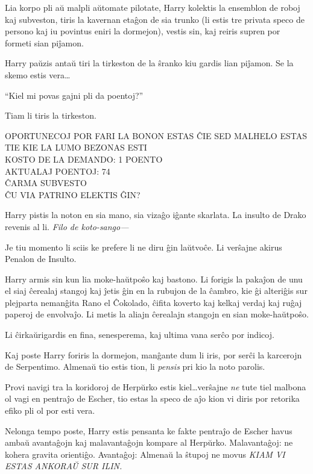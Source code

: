 Lia korpo pli aŭ malpli aŭtomate pilotate, Harry kolektis la ensemblon
de roboj kaj subveston, tiris la kavernan etaĝon de sia trunko (li estis
tre privata speco de persono kaj iu povintus eniri la dormejon), vestis
sin, kaj reiris supren por formeti sian piĵamon.

Harry paŭzis antaŭ tiri la tirkeston de la ŝranko kiu gardis lian
piĵamon. Se la skemo estis vera\ldots

``Kiel mi povas gajni pli da poentoj?''

Tiam li tiris la tirkeston.

\begin{center}
OPORTUNECOJ POR FARI LA BONON ESTAS ĈIE SED MALHELO ESTAS TIE KIE LA
LUMO BEZONAS ESTI \\
KOSTO DE LA DEMANDO: 1 POENTO\\
AKTUALAJ POENTOJ: 74\\
ĈARMA SUBVESTO \\
ĈU VIA PATRINO ELEKTIS ĜIN? \\
\end{center}

Harry pistis la noton en sia mano, sia vizaĝo iĝante skarlata. La
insulto de Drako revenis al li. \emph{Filo de koto-sango—}

Je tiu momento li sciis ke prefere li ne diru ĝin laŭtvoĉe. Li
verŝajne akirus Penalon de Insulto.

Harry armis sin kun lia moke-haŭtpoŝo kaj bastono. Li forigis la
pakaĵon de unu el siaj ĉerealaj stangoj kaj ĵetis ĝin en la rubujon de
la ĉambro, kie ĝi alteriĝis sur plejparta nemanĝita Rano el Ĉokolado,
ĉifita koverto kaj kelkaj verdaj kaj ruĝaj paperoj de envolvaĵo. Li
metis la aliajn ĉerealajn stangojn en sian moke-haŭtpoŝo.

Li ĉirkaŭrigardis en fina, senesperema, kaj ultima vana serĉo por
indicoj.

Kaj poste Harry foriris la dormejon, manĝante dum li iris, por serĉi
la karcerojn de Serpentimo. Almenaŭ tio estis tion, li
\emph{pensis} pri kio la noto parolis.

Provi navigi tra la koridoroj de Herpŭrko estis kiel\ldots verŝajne
\emph{ne} tute tiel malbona ol vagi en pentraĵo de Escher, tio estas
la speco de aĵo kion vi diris por retorika efiko pli ol por esti vera.

Nelonga tempo poste, Harry estis pensanta ke fakte pentraĵo de Escher
havus ambaŭ avantaĝojn kaj malavantaĝojn kompare al
Herpŭrko. Malavantaĝoj: ne kohera gravita orientiĝo. Avantaĝoj:
Almenaŭ la ŝtupoj ne movus \emph{KIAM VI ESTAS ANKORAŬ SUR ILIN.}

